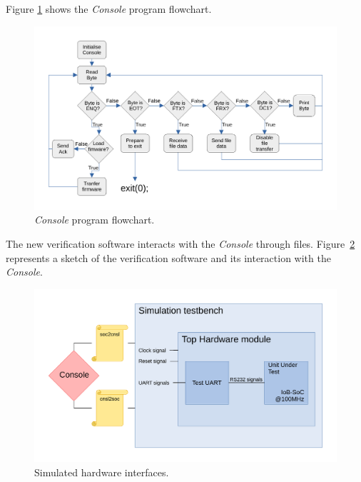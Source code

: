 Figure \ref{fig:console_flow} shows the \textit{Console} program flowchart.

\begin{figure}[!ht]
    \centering
    \includegraphics[width=\linewidth]{../images/console_flow.pdf}
    \caption{\textit{Console} program flowchart.}
    \label{fig:console_flow}
\end{figure}

The new verification software interacts with the \textit{Console} through files. Figure~\ref{fig:uut_top_hw} represents a sketch of the verification software and its interaction with the \textit{Console}.

\begin{figure}[!ht]
    \centering
    \includegraphics[width=\linewidth]{../images/uut_top_hw.pdf}
    \caption{Simulated hardware interfaces.}
    \label{fig:uut_top_hw}
\end{figure}